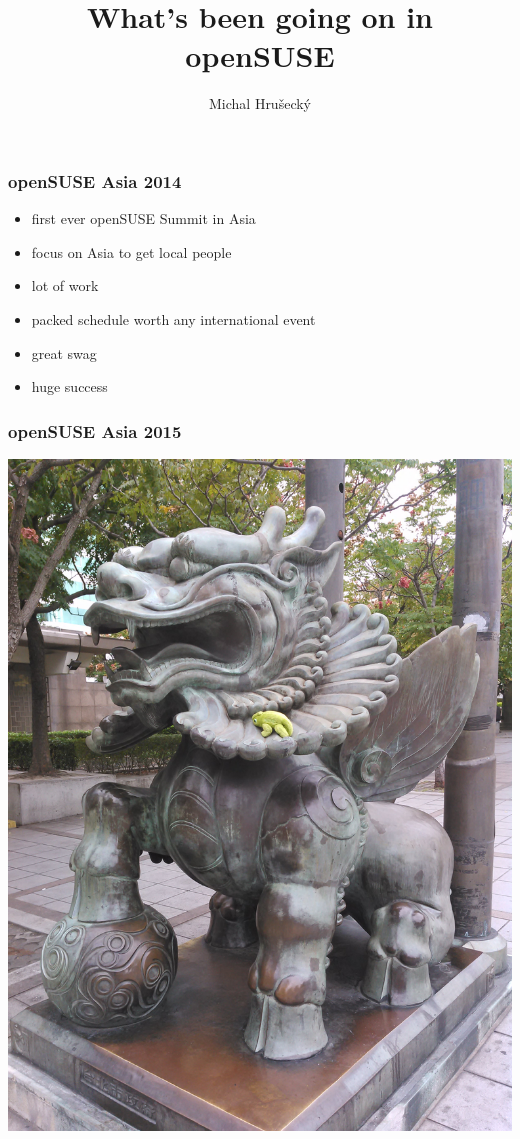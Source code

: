 \documentclass{beamer}
\author{Michal Hru\v{s}eck\'{y}\newline {\small openSUSE Board}}
\title{What's been going on in openSUSE}
\begin{document}
\begin{frame}[t,plain]
\titlepage
\end{frame}


\begin{frame}[t]
\frametitle{openSUSE Asia 2014}
\begin{itemize}
\item first ever openSUSE Summit in Asia
\item focus on Asia to get local people
\item lot of work
\item packed schedule worth any international event
\item great swag
\item huge success
\end{itemize}
\end{frame}

\begin{frame}[t]
\frametitle{openSUSE Asia 2015}
\begin{center}
\includegraphics[width=.7\paperheight,angle=270,origin=c]{geekointaipei}
\end{center}
\end{frame}
\end{document}

